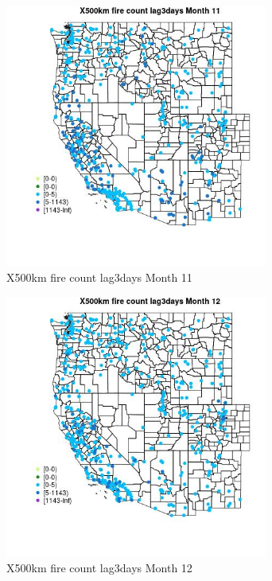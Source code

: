 \begin{figure} 
\centering  
\includegraphics[width=0.77\textwidth]{Code_Outputs/Report_ML_input_PM25_Step4_part_e_de_duplicated_aves_compiled_2019-05-14wNAs_MapObsMo11X500km_fire_count_lag3days.jpg} 
\caption{\label{fig:Report_ML_input_PM25_Step4_part_e_de_duplicated_aves_compiled_2019-05-14wNAsMapObsMo11X500km_fire_count_lag3days}X500km fire count lag3days Month 11} 
\end{figure} 
 

\begin{figure} 
\centering  
\includegraphics[width=0.77\textwidth]{Code_Outputs/Report_ML_input_PM25_Step4_part_e_de_duplicated_aves_compiled_2019-05-14wNAs_MapObsMo12X500km_fire_count_lag3days.jpg} 
\caption{\label{fig:Report_ML_input_PM25_Step4_part_e_de_duplicated_aves_compiled_2019-05-14wNAsMapObsMo12X500km_fire_count_lag3days}X500km fire count lag3days Month 12} 
\end{figure} 
 

